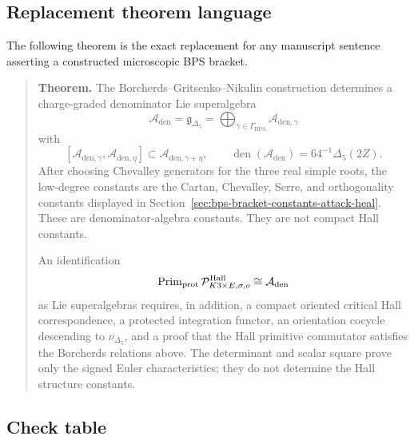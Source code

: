 \subsection{Replacement theorem language}

The following theorem is the exact replacement for any manuscript
sentence asserting a constructed microscopic BPS bracket.

\begin{quote}
\textbf{Theorem.}
The Borcherds--Gritsenko--Nikulin construction determines a
charge-graded denominator Lie superalgebra
\[
\mathcal A_{\mathrm{den}}=\mathfrak g_{\Delta_5}
=\bigoplus_{\gamma\in\Gamma_{\mathrm{BPS}}}
\mathcal A_{\mathrm{den},\gamma}
\]
with
\[
[\mathcal A_{\mathrm{den},\gamma},
\mathcal A_{\mathrm{den},\eta}]
\subset
\mathcal A_{\mathrm{den},\gamma+\eta},
\qquad
\operatorname{den}(\mathcal A_{\mathrm{den}})
=64^{-1}\Delta_5(2Z).
\]
After choosing Chevalley generators for the three real simple roots,
the low-degree constants are the Cartan, Chevalley, Serre, and
orthogonality constants displayed in
Section~\ref{sec:bps-bracket-constants-attack-heal}.  These are
denominator-algebra constants.  They are not compact Hall constants.

An identification
\[
\operatorname{Prim}_{\mathrm{prot}}
\mathcal P^{\mathrm{Hall}}_{K3\times E,\sigma,o}
\cong
\mathcal A_{\mathrm{den}}
\]
as Lie superalgebras requires, in addition, a compact oriented critical
Hall correspondence, a protected integration functor, an orientation
cocycle descending to \(\nu_{\Delta_5}\), and a proof that the Hall
primitive commutator satisfies the Borcherds relations above.  The
determinant and scalar square prove only the signed Euler
characteristics; they do not determine the Hall structure constants.
\end{quote}

\subsection{Check table}

